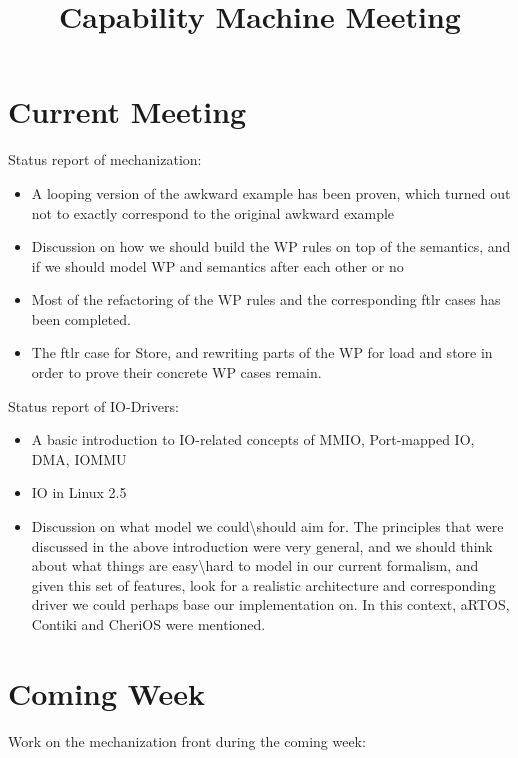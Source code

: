 \documentclass{article}
\title{Capability Machine Meeting}
\begin{document}
\maketitle

\section*{Current Meeting}

Status report of mechanization: 

\begin{itemize}
\item A looping version of the awkward example has been proven, which turned out not to exactly correspond to the original awkward example
\item Discussion on how we should build the WP rules on top of the semantics, and if we should model WP and semantics after each other or no
\item Most of the refactoring of the WP rules and the corresponding ftlr cases has been completed.
\item The ftlr case for Store, and rewriting parts of the WP for load and store in order to prove their concrete WP cases remain. 
\end{itemize}

Status report of IO-Drivers:

\begin{itemize}
\item A basic introduction to IO-related concepts of MMIO, Port-mapped IO, DMA, IOMMU
\item IO in Linux 2.5
\item Discussion on what model we could\textbackslash should aim for. The principles that were discussed in the above introduction were very general, and we should think about what things are easy\textbackslash hard to model in our current formalism, and given this set of features, look for a realistic architecture and corresponding driver we could perhaps base our implementation on. In this context, aRTOS, Contiki and CheriOS were mentioned.
\end{itemize}

\section*{Coming Week}

Work on the mechanization front during the coming week: 
\end{document}
